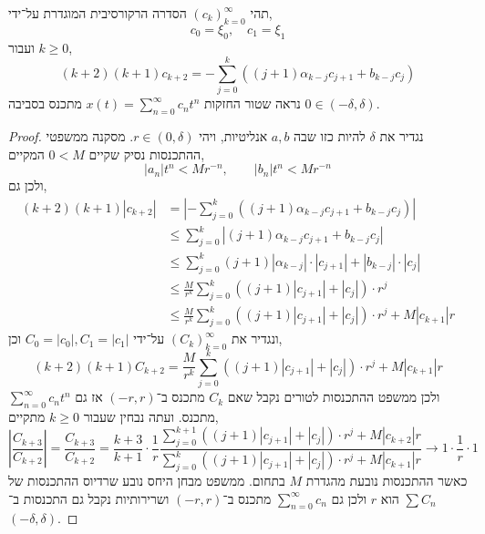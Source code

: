 \subquestion{}
תהי ${(c_k)}_{k = 0}^{\infty}$ הסדרה הרקורסיבית המוגדרת על־ידי,
\[
	c_0 = \xi_0,
	\quad
	c_1 = \xi_1
\]
ועבור $k \ge 0$,
\[
	(k + 2)(k + 1) c_{k + 2}
	= - \sum_{j = 0}^k ( (j + 1) \alpha_{k - j} c_{j + 1} + b_{k - j} c_j)
\]
נראה שטור החזקות $x(t) = \sum_{n = 0}^\infty c_n t^n$ מתכנס בסביבה $0 \in (-\delta, \delta)$.
\begin{proof}
	נגדיר את $\delta$ להיות כזו שבה $a, b$ אנליטיות, ויהי $r \in (0, \delta)$.
	מסקנה ממשפטי ההתכנסות נסיק שקיים $0 < M$ המקיים,
	\[
		|a_n| t^n < M r^{-n},
		\qquad
		|b_n| t^n < M r^{-n}
	\]
	ולכן גם,
	\begin{align*}
		(k + 2)(k + 1) |c_{k + 2}|
		& = \left\lvert - \sum_{j = 0}^k ( (j + 1) \alpha_{k - j} c_{j + 1} + b_{k - j} c_j) \right\rvert \\
		& \le \sum_{j = 0}^k \left\lvert (j + 1) \alpha_{k - j} c_{j + 1} + b_{k - j} c_j \right\rvert \\
		& \le \sum_{j = 0}^k (j + 1) |\alpha_{k - j}| \cdot |c_{j + 1}| + |b_{k - j}| \cdot |c_j| \\
		& \le \frac{M}{r^k} \sum_{j = 0}^k ((j + 1) |c_{j + 1}| + |c_j|) \cdot r^j \\
		& \le \frac{M}{r^k} \sum_{j = 0}^k ((j + 1) |c_{j + 1}| + |c_j|) \cdot r^j + M |c_{k + 1}| r
	\end{align*}
	ונגדיר את ${(C_k)}_{k = 0}^{\infty}$ על־ידי $C_0 = |c_0|, C_1 = |c_1|$ וכן,
	\[
		(k + 2)(k + 1) C_{k + 2}
		= \frac{M}{r^k} \sum_{j = 0}^k ((j + 1) |c_{j + 1}| + |c_j|) \cdot r^j + M |c_{k + 1}| r
	\]
	ולכן ממשפט ההתכנסות לטורים נקבל שאם $C_k$ מתכנס ב־$(-r, r)$ אז גם $\sum_{n = 0}^\infty c_n t^n$ מתכנס.
	ועתה נבחין שעבור $k \ge 0$ מתקיים,
	\[
		\left\lvert \frac{C_{k + 3}}{C_{k + 2}} \right\rvert
		= \frac{C_{k + 3}}{C_{k + 2}}
		= \frac{k + 3}{k + 1} \cdot \frac{1}{r} \frac{\sum_{j = 0}^{k + 1} ((j + 1) |c_{j + 1}| + |c_j|) \cdot r^j + M |c_{k + 2}| r}{\sum_{j = 0}^k ((j + 1) |c_{j + 1}| + |c_j|) \cdot r^j + M |c_{k + 1}| r}
		\to 1 \cdot \frac{1}{r} \cdot 1
	\]
	כאשר ההתכנסות נובעת מהגדרת $M$ בתחום.
	ממשפט מבחן היחס נובע שרדיוס ההתכנסות של $\sum C_n$ הוא $r$ ולכן גם $\sum_{n = 0}^\infty c_n$ מתכנס ב־$(-r, r)$ ושרירותיות נקבל גם התכנסות ב־$(-\delta, \delta)$.
\end{proof}


